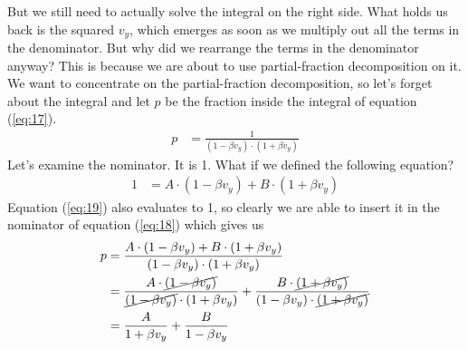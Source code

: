 \documentclass[paper=a4, fontsize=11pt]{scrartcl} %
\numberwithin{equation}{section} %
\numberwithin{figure}{section} %
\numberwithin{table}{section} %
\begin{document}
But we still need to actually solve the integral on the right side. What holds us back is the squared $v_y$, which emerges as soon as we
multiply out all the terms in the denominator. But why did we rearrange the terms in the denominator anyway? This is because we are about to
use partial-fraction decomposition on it. We want to concentrate on the partial-fraction decomposition, so let's 
forget about the integral and let $p$ be the fraction inside the integral of equation (\ref{eq:17}).
\begin{align} \label{eq:18}
p &= \frac{1}{(1 - \beta v_y)\cdot (1 + \beta v_y)}
\end{align}
Let's examine the nominator. It is 1. What if we defined the following equation?
\begin{align} \label{eq:19}
1 &= A \cdot (1 - \beta v_y) + B \cdot (1 + \beta v_y)
\end{align}
Equation (\ref{eq:19}) also evaluates to 1, so clearly we are able to insert it in the nominator of equation (\ref{eq:18})
which gives us
\begin{align} 
p &= \frac{A \cdot (1 - \beta v_y) + B \cdot (1 + \beta v_y)}{(1 - \beta v_y)\cdot (1 + \beta v_y)} \\
  &= \frac{A \cdot \cancel{(1 - \beta v_y)}}{\cancel{(1 - \beta v_y)}\cdot (1 + \beta v_y)} +
     \frac{B \cdot \cancel{(1 + \beta v_y)}}{(1 - \beta v_y)\cdot \cancel{(1 + \beta v_y)}} \\
  &= \frac{A}{1 + \beta v_y} + \frac{B}{1 - \beta v_y} \label{eq:20}
\end{align}
\end{document}
